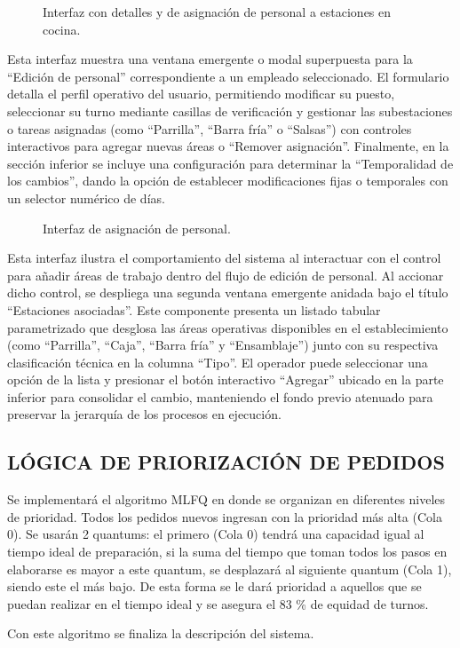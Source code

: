 \begin{figure}[H]
    \centering
    
    \caption{Interfaz con detalles y de asignación de personal a estaciones en cocina.}
    \label{fig:ui-coc-04}
\end{figure}

Esta interfaz muestra una ventana emergente o modal superpuesta para la ``Edición de personal'' correspondiente a un empleado seleccionado. El formulario detalla el perfil operativo del usuario, permitiendo modificar su puesto, seleccionar su turno mediante casillas de verificación y gestionar las subestaciones o tareas asignadas (como ``Parrilla'', ``Barra fría'' o ``Salsas'') con controles interactivos para agregar nuevas áreas o ``Remover asignación''. Finalmente, en la sección inferior se incluye una configuración para determinar la ``Temporalidad de los cambios'', dando la opción de establecer modificaciones fijas o temporales con un selector numérico de días.

\begin{figure}[H]
    \centering
    
    \caption{Interfaz de asignación de personal.}
    \label{fig:ui-coc-05}
\end{figure}

Esta interfaz ilustra el comportamiento del sistema al interactuar con el control para añadir áreas de trabajo dentro del flujo de edición de personal. Al accionar dicho control, se despliega una segunda ventana emergente anidada bajo el título ``Estaciones asociadas''. Este componente presenta un listado tabular parametrizado que desglosa las áreas operativas disponibles en el establecimiento (como ``Parrilla'', ``Caja'', ``Barra fría'' y ``Ensamblaje'') junto con su respectiva clasificación técnica en la columna ``Tipo''. El operador puede seleccionar una opción de la lista y presionar el botón interactivo ``Agregar'' ubicado en la parte inferior para consolidar el cambio, manteniendo el fondo previo atenuado para preservar la jerarquía de los procesos en ejecución.

\subsection{LÓGICA DE PRIORIZACIÓN DE PEDIDOS}
Se implementará el algoritmo MLFQ \cite{salomo2019multilevel} en donde se organizan en diferentes niveles de prioridad. Todos los pedidos nuevos ingresan con la prioridad más alta (Cola 0). Se usarán 2 quantums: el primero (Cola 0) tendrá una capacidad igual al tiempo ideal de preparación, si la suma del tiempo que toman todos los pasos en elaborarse es mayor a este quantum, se desplazará al siguiente quantum (Cola 1), siendo este el más bajo. De esta forma se le dará prioridad a aquellos que se puedan realizar en el tiempo ideal y se asegura el 83 \% de equidad de turnos.

Con este algoritmo se finaliza la descripción del sistema.